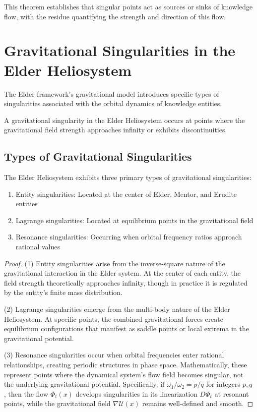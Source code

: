 This theorem establishes that singular points act as sources or sinks of knowledge flow, with the residue quantifying the strength and direction of this flow.

\section{Gravitational Singularities in the Elder Heliosystem}

The Elder framework's gravitational model introduces specific types of singularities associated with the orbital dynamics of knowledge entities.

\begin{definition}
A gravitational singularity in the Elder Heliosystem occurs at points where the gravitational field strength approaches infinity or exhibits discontinuities.
\end{definition}

\subsection{Types of Gravitational Singularities}

\begin{theorem}
The Elder Heliosystem exhibits three primary types of gravitational singularities:
\begin{enumerate}
    \item Entity singularities: Located at the center of Elder, Mentor, and Erudite entities
    \item Lagrange singularities: Located at equilibrium points in the gravitational field
    \item Resonance singularities: Occurring when orbital frequency ratios approach rational values
\end{enumerate}
\end{theorem}

\begin{proof}
(1) Entity singularities arise from the inverse-square nature of the gravitational interaction in the Elder system. At the center of each entity, the field strength theoretically approaches infinity, though in practice it is regulated by the entity's finite mass distribution.

(2) Lagrange singularities emerge from the multi-body nature of the Elder Heliosystem. At specific points, the combined gravitational forces create equilibrium configurations that manifest as saddle points or local extrema in the gravitational potential.

(3) Resonance singularities occur when orbital frequencies enter rational relationships, creating periodic structures in phase space. Mathematically, these represent points where the dynamical system's flow field becomes singular, not the underlying gravitational potential. Specifically, if $\omega_1/\omega_2 = p/q$ for integers $p,q$, then the flow $\Phi_t(x)$ develops singularities in its linearization $D\Phi_t$ at resonant points, while the gravitational field $\nabla \mathcal{U}(x)$ remains well-defined and smooth.
\end{proof}

